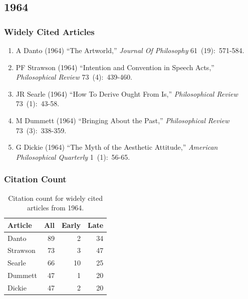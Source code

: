 \documentclass[
  10pt,
  letterpaper,
  DIV=11,
  numbers=noendperiod,
  twoside]{scrartcl}
\providecommand{\tightlist}{%
  \setlength{\itemsep}{0pt}\setlength{\parskip}{0pt}}\usepackage{longtable,booktabs,array}
\begin{document}
\newpage

\subsection{1964}\label{sec-s1964}

\subsubsection*{Widely Cited Articles}\label{widely-cited-articles-7}

\begin{enumerate}
\def\labelenumi{\arabic{enumi}.}
\tightlist
\item
  A Danto (1964) ``The Artworld,'' \emph{Journal Of Philosophy}
  61~(19):~571-584.
\item
  PF Strawson (1964) ``Intention and Convention in Speech Acts,''
  \emph{Philosophical Review} 73~(4):~439-460.
\item
  JR Searle (1964) ``How To Derive Ought From Is,'' \emph{Philosophical
  Review} 73~(1):~43-58.
\item
  M Dummett (1964) ``Bringing About the Past,'' \emph{Philosophical
  Review} 73~(3):~338-359.
\item
  G Dickie (1964) ``The Myth of the Aesthetic Attitude,'' \emph{American
  Philosophical Quarterly} 1~(1):~56-65.
\end{enumerate}

\subsubsection*{Citation Count}\label{sec-count-1964}

\begin{longtable}[]{@{}lrrr@{}}

\caption{\label{tbl-citation-count-1964}Citation count for widely cited
articles from 1964.}

\tabularnewline

\toprule\noalign{}
Article & All & Early & Late \\
\midrule\noalign{}
\endhead
\bottomrule\noalign{}
\endlastfoot
Danto & 89 & 2 & 34 \\
Strawson & 73 & 3 & 47 \\
Searle & 66 & 10 & 25 \\
Dummett & 47 & 1 & 20 \\
Dickie & 47 & 2 & 20 \\

\end{longtable}
\end{document}
